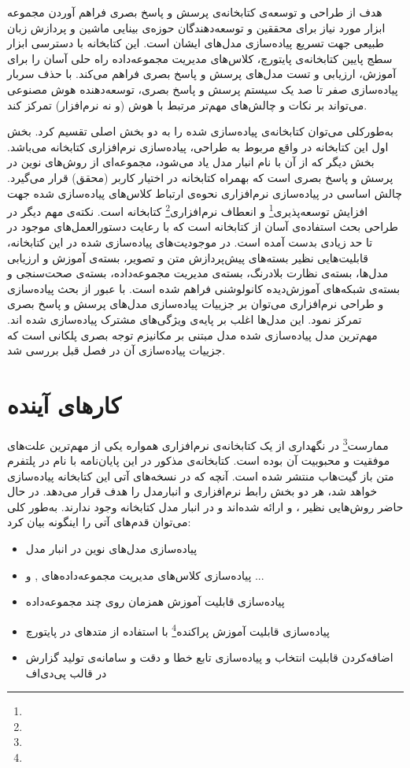 هدف از طراحی و توسعه‌‌ی کتابخانه‌ی پرسش و پاسخ بصری فراهم آوردن مجموعه ابزار مورد نیاز برای محققین و توسعه‌دهندگان حوزه‌ی بینایی ماشین و پردازش زبان طبیعی جهت تسریع پیاده‌سازی مدل‌های ایشان است. این کتابخانه با دسترسی ابزار سطج پایین کتابخانه‌ی پایتورچ، کلاس‌های مدیریت مجموعه‌داده         راه حلی آسان را برای آموزش، ارزیابی و تست مدل‌های پرسش و پاسخ بصری فراهم می‌کند. با حذف سربار پیاده‌سازی صفر تا صد یک سیستم پرسش و پاسخ بصری، توسعه‌دهنده هوش مصنوعی می‌تواند بر نکات  و چالش‌های مهم‌تر مرتبط با هوش (و نه نرم‌افزار) تمرکز کند.

به‌طورکلی می‌توان کتابخانه‌ی پیاده‌سازی شده را به دو بخش اصلی تقسیم کرد. بخش اول این کتابخانه در واقع مربوط به طراحی، پیاده‌سازی نرم‌افزاری کتابخانه می‌باشد. بخش دیگر که از آن با نام انبار مدل یاد می‌شود، مجموعه‌ای از روش‌های نوین در پرسش‌ و پاسخ بصری است که بهمراه کتابخانه در اختیار کاربر (محقق) قرار می‌گیرد. چالش اساسی در پیاده‌سازی نرم‌افزاری نحوه‌ی ارتباط کلاس‌های پیاده‌سازی شده جهت افزایش توسعه‌پذیری\footnote{} و انعطاف نرم‌افزاری\footnote{} کتابخانه‌ است. نکته‌ی مهم دیگر در طراحی بحث استفاده‌ی آسان از کتابخانه‌ است که با رعایت دستور‌العمل‌های موجود در \cite{pressman2005software} تا حد زیادی بدست آمده است. در موجودیت‌های پیاده‌سازی شده در این کتابخانه، قابلیت‌هایی نظیر بسته‌‌های پیش‌پردازش متن و تصویر، بسته‌ی آموزش و ارزیابی مدل‌ها، بسته‌ی نظارت بلادرنگ، بسته‌ی مدیریت مجموعه‌داده، بسته‌ی صحت‌سنجی و بسته‌ی شبکه‌های آموزش‌دیده کانولوشنی فراهم شده است. با عبور از بحث پیاده‌سازی و طراحی نرم‌افزاری می‌توان بر جزییات پیاده‌سازی مدل‌های پرسش و پاسخ بصری تمرکز نمود. این مدل‌ها اغلب بر پایه‌ی ویژگی‌های مشترک پیاده‌سازی شده اند. مهم‌ترین مدل‌ پیاده‌سازی شده مدل مبتنی بر مکانیزم توجه ‌بصری پلکانی است که جزییات پیاده‌سازی آن در فصل قبل بررسی شد.

\section{کارهای آینده}
ممارست\footnote{} در نگهداری از یک کتابخانه‌ی نرم‌افزاری همواره یکی از مهم‌ترین علت‌های موفقیت و محبوبیت آن بوده‌ است. کتابخانه‌ی مذکور در این پایان‌نامه با نام  در پلتفرم متن باز گیت‌هاب منتشر شده است. آنچه که در نسخه‌های آتی این کتابخانه پیاده‌سازی خواهد شد، هر دو بخش رابط نرم‌افزاری و انبار‌مدل را هدف قرار می‌دهد. در حال حاضر روش‌هایی نظیر \cite{shah2019cycle}، \cite{ben2019block} و \cite{zhou2019dynamic} ارائه‌ شده‌اند و در انبار مدل کتابخانه وجود ندارند. به‌طور کلی می‌توان قدم‌های آتی را اینگونه بیان‌ کرد:

\begin{itemize}
	\item پیاده‌سازی مدل‌های نوین در انبار مدل
	\item پیاده‌سازی کلا‌س‌های مدیریت مجموعه‌داده‌های ,  و ...
	\item ‌‌پیاده‌سازی قابلیت آموزش همزمان روی چند مجموعه‌داده
	\item پیاده‌سازی قابلیت آموزش پراکنده\footnote{} با استفاده از متد‌های  
	در پایتورچ

	\item اضافه‌کردن قابلیت انتخاب و پیاده‌سازی تابع خطا و دقت و سامانه‌ی تولید گزارش در قالب پی‌دی‌اف
\end{itemize}